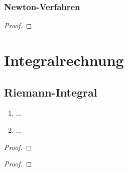 \documentclass[12pt]{scrreprt}
\begin{document}
\subsection*{Newton-Verfahren}

\begin{thm}\label{}

\end{thm}
\begin{proof}

\end{proof}

\begin{bsp}\label{}

\end{bsp}

\chapter{Integralrechnung}
\label{cha:int}

\section{Riemann-Integral}
\label{}

\begin{dfn}\label{}

\end{dfn}

\begin{lem}\label{}
\begin{enumerate}
\item ...
\item ...
\end{enumerate}
\end{lem}
\begin{proof}

\end{proof}

\begin{bsp}\label{}

\end{bsp}

\begin{bem}\label{}

\end{bem}

\begin{satz}\label{}

\end{satz}
\begin{proof}

\end{proof}
\end{document}
